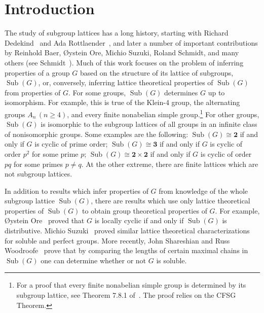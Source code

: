 \documentclass[11pt]{amsart}
\theoremstyle{plain}
\theoremstyle{definition}
\theoremstyle{remark}
\numberwithin{theorem}{section}
\numberwithin{claim}{section}
\numberwithin{equation}{section}
\numberwithin{conjecture}{section}
\newcommand{\<}{\ensuremath{\langle}}
\renewcommand{\>}{\ensuremath{\rangle}}
\renewcommand{\geq}{\ensuremath{\geqslant}}
\newcommand{\Sub}{\ensuremath{\operatorname{Sub}}}
\newcommand{\0}{\ensuremath{\mathbf{0}}}
\newcommand{\1}{\ensuremath{\mathbf{1}}}
\newcommand{\2}{\ensuremath{\mathbf{2}}}
\newcommand{\3}{\ensuremath{\mathbf{3}}}
\newcommand{\4}{\ensuremath{\mathbf{4}}}
\newcommand{\5}{\ensuremath{\mathbf{5}}}
\begin{document}
\section{Introduction}
\label{sec:intro}
The study of subgroup lattices has a long history, starting 
with 
Richard Dedekind~\cite{Dedekind:1877} 
and 
Ada Rottlaender~\cite{Rottlaender:1928}, and
later a number of important contributions by Reinhold Baer, 
{\O}ystein Ore, 
Michio Suzuki, 
Roland Schmidt, 
and many others (see Schmidt~\cite{Schmidt:1994}).
Much of this work focuses on the problem of inferring
properties of a group $G$ based on the structure of its lattice of subgroups,
$\Sub(G)$,  or, conversely,  inferring lattice theoretical properties of $\Sub(G)$ from properties of
$G$. For some groups, $\Sub(G)$ determines $G$ up to isomorphism.
For example, this is true of the Klein-4 group, the alternating groups
$A_n\, (n\geq 4)$, and every finite nonabelian simple group.\footnote{For a
  proof that every finite nonabelian simple group is determined by its subgroup
  lattice, see Theorem 7.8.1 of~\cite{Schmidt:1994}.  The proof relies on the
 CFSG Theorem.} 
For other groups,
$\Sub(G)$ is isomorphic to the subgroup lattices of all groups in an infinite class
of nonisomorphic groups. 
Some examples are the following: $\Sub(G)\cong \2$ if and only if $G$ is cyclic of prime order;
$\Sub(G)\cong \3$ if and only if $G$ is cyclic of order
$p^2$ for some prime $p$; $\Sub(G)\cong \2\times \2$ if and only if $G$ is
cyclic of order $pq$ for some primes $p\neq q$.  At the other extreme, there are
finite lattices which are not subgroup lattices. %

In addition to results which infer properties of $G$ from knowledge of the
whole subgroup lattice $\Sub(G)$, there are results which use only lattice
theoretical properties of $\Sub(G)$ to obtain group theoretical properties of $G$.
For example, {\O}ystein Ore~\cite{Ore:1937,Ore:1938} 
proved that $G$ is locally cyclic if and only if $\Sub(G)$ is
distributive.  Michio Suzuki~\cite{Suzuki:1951} proved similar lattice theoretical
characterizations for soluble and perfect groups. More recently, 
John Shareshian and Russ Woodroofe~\cite{Shareshian:2012} prove that by comparing the lengths of certain maximal
chains in $\Sub(G)$ one can determine whether or not $G$ is soluble.
\end{document}
